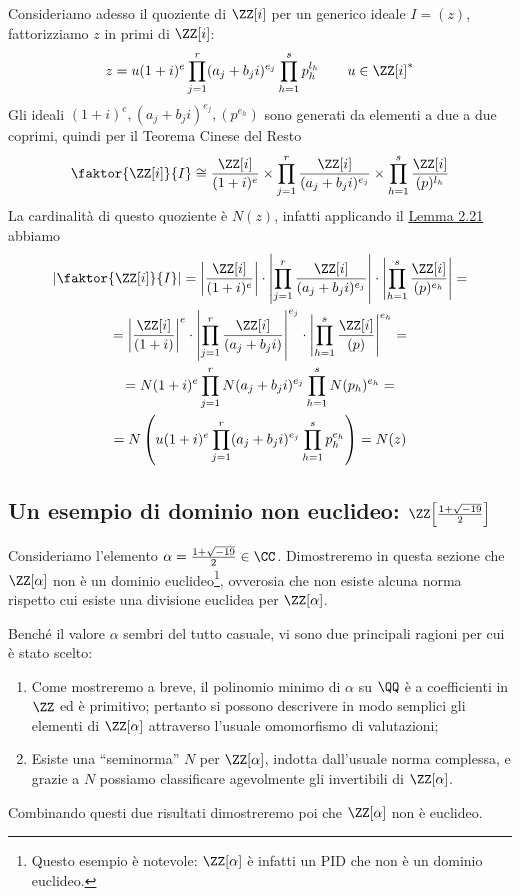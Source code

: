\documentclass[11pt]{scrartcl}
\begin{document}
	Consideriamo adesso il quoziente di $\ZZ[i]$ per un generico ideale $I = (z)$,
	fattorizziamo $z$ in primi di $\ZZ[i]$:
	\[
	z = u(1 + i)^e\prod_{j = 1}^r (a_j + b_j i)^{e_j}\prod_{h = 1}^s p_h^{l_h}
	\qquad u \in \ZZ[i]^*
	\]
	Gli ideali $(1 + i)^e, (a_j + b_ji)^{e_j}, (p^{e_h})$ sono generati da elementi a due a due coprimi,
	quindi per il Teorema Cinese del Resto
	\[
	\faktor{\ZZ[i]}{I} \cong \frac{\ZZ[i]}{(1 + i)^e}\times
	\prod_{j = 1}^r\frac{\ZZ[i]}{(a_j + b_ji)^{e_j}}
	\times \prod_{h = 1}^s \frac{\ZZ[i]}{(p)^{l_h}}
	\]
	La cardinalità di questo quoziente è $N(z)$, infatti applicando il 
	\hyperref[lemma2.21]{Lemma 2.21} abbiamo
	\begin{multline*}
		\left|\faktor{\ZZ[i]}{I}\right| = \left|\frac{\ZZ[i]}{(1 + i)^e}\right|\cdot
		\left|\prod_{j = 1}^r\frac{\ZZ[i]}{(a_j + b_ji)^{e_j}}\right|\cdot
		\left|\prod_{h = 1}^s \frac{\ZZ[i]}{(p)^{e_h}}\right| = \\
		= \left|\frac{\ZZ[i]}{(1 + i)}\right|^e\cdot
		\left|\prod_{j = 1}^r\frac{\ZZ[i]}{(a_j + b_ji)}\right|^{e_j}\cdot
		\left|\prod_{h = 1}^s \frac{\ZZ[i]}{(p)}\right|^{e_h} = \\
		= N(1 + i)^e\prod_{j = 1}^r N(a_j + b_ji)^{e_j}\prod_{h = 1}^s N(p_h)^{e_h} = \\
		= N\left(u(1 + i)^e\prod_{j = 1}^r (a_j + b_j i)^{e_j}\prod_{h = 1}^s p_h^{e_h}\right)
		= N(z)\\
	\end{multline*}
	
	\newpage
	
	\subsection{Un esempio di dominio non euclideo: \texorpdfstring{{$\ZZ\!\left[\frac{1 + \sqrt{-19}}{2}\right]$}}{ℤ{[}(1+√−19)/2{]}}}
	
	Consideriamo l'elemento $\alpha = \frac{1 + \sqrt{-19}}{2} \in \CC$. Dimostreremo
	in questa sezione che $\ZZ[\alpha]$ non è un dominio euclideo\footnote{
		Questo esempio è notevole: $\ZZ[\alpha]$ è infatti un PID che non
		è un dominio euclideo.
	}, ovverosia che
	non esiste alcuna norma rispetto cui esiste una divisione euclidea per
	$\ZZ[\alpha]$. \medskip
	
	
	Benché il valore $\alpha$ sembri del tutto casuale, vi sono due principali
	ragioni per cui è stato scelto:
	\begin{enumerate}[1.]
		\item Come mostreremo a breve, il polinomio minimo di $\alpha$ su $\QQ$
		è a coefficienti in $\ZZ$ ed è primitivo; pertanto si possono descrivere
		in modo semplici gli elementi di $\ZZ[\alpha]$ attraverso
		l'usuale omomorfismo di valutazioni;
		\item Esiste una ``seminorma'' $N$ per $\ZZ[\alpha]$, indotta dall'usuale
		norma complessa, e grazie a $N$ possiamo classificare agevolmente gli
		invertibili di $\ZZ[\alpha]$.
	\end{enumerate}
	Combinando questi due risultati dimostreremo poi che $\ZZ[\alpha]$ non
	è euclideo. \medskip
	
\end{document}
